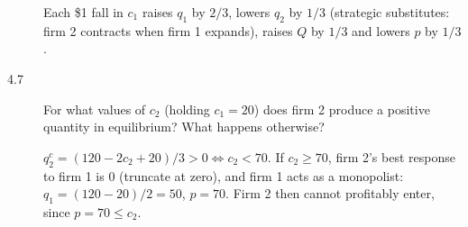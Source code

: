 \begin{description}
\begin{solution}
Each \$1 fall in $c_1$ raises $q_1$ by $2/3$, lowers $q_2$ by $1/3$ (strategic substitutes: firm 2 contracts when firm 1 expands), raises $Q$ by $1/3$ and lowers $p$ by $1/3$.
\end{solution}
\item[4.7] For what values of $c_2$ (holding $c_1=20$) does firm 2 produce a positive quantity in equilibrium? What happens otherwise?
\begin{solution}
$q_2^c=(120-2c_2+20)/3>0\iff c_2<70$. If $c_2\ge70$, firm 2's best response to firm 1 is $0$ (truncate at zero), and firm 1 acts as a monopolist: $q_1=(120-20)/2=50$, $p=70$. Firm 2 then cannot profitably enter, since $p=70\le c_2$.
\end{solution}
\end{description}

